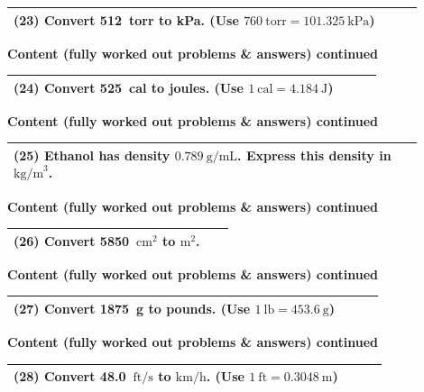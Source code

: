 \documentclass{article}
\begin{document}
\begin{tabular}{|p{0.9\linewidth}|}
\hline
\vspace{0.2cm}

\textbf{(23)} Convert 512~torr to kPa. (Use $760~\text{torr}=101.325~\text{kPa}$) \\
\hline
\end{tabular}
\newpage
\noindent
{\large \textbf{Content (fully worked out problems \& answers) continued}} \\[0.2em]
\begin{tabular}{|p{0.9\linewidth}|}
\hline
\vspace{0.2cm}

\textbf{(24)} Convert 525~cal to joules. (Use $1~\text{cal}=4.184~\text{J}$) \\
\hline
\end{tabular}
\newpage
\noindent
{\large \textbf{Content (fully worked out problems \& answers) continued}} \\[0.2em]
\begin{tabular}{|p{0.9\linewidth}|}
\hline
\vspace{0.2cm}

\textbf{(25)} Ethanol has density $0.789~\text{g/mL}$. Express this density in $\text{kg/m}^3$. \\
\hline
\end{tabular}
\newpage
\noindent
{\large \textbf{Content (fully worked out problems \& answers) continued}} \\[0.2em]
\begin{tabular}{|p{0.9\linewidth}|}
\hline
\vspace{0.2cm}

\textbf{(26)} Convert 5850~$\text{cm}^2$ to $\text{m}^2$. \\
\hline
\end{tabular}
\newpage
\noindent
{\large \textbf{Content (fully worked out problems \& answers) continued}} \\[0.2em]
\begin{tabular}{|p{0.9\linewidth}|}
\hline
\vspace{0.2cm}

\textbf{(27)} Convert 1875~g to pounds. (Use $1~\text{lb}=453.6~\text{g}$) \\
\hline
\end{tabular}
\newpage
\noindent
{\large \textbf{Content (fully worked out problems \& answers) continued}} \\[0.2em]
\begin{tabular}{|p{0.9\linewidth}|}
\hline
\vspace{0.2cm}

\textbf{(28)} Convert 48.0~$\text{ft/s}$ to $\text{km/h}$. (Use $1~\text{ft}=0.3048~\text{m}$) \\
\hline
\end{tabular}
\end{document}

